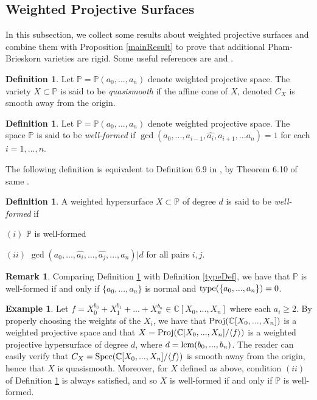 \documentclass[12pt]{amsart}
\theoremstyle{plain}
\theoremstyle{definition}
\newtheorem{definition}[subsection]{Definition}
\newtheorem{example}[subsection]{Example}
\newtheorem{remark}[subsection]{Remark}
\newcommand{\Spec}{		\operatorname{{\rm Spec}}}
\newcommand{\Proj}{		\operatorname{{\rm Proj}}}
\newcommand{\lcm}{		\operatorname{{\rm lcm}}}
\newcommand{\type}{		\operatorname{{\rm type}}}
\newcommand{\lb}{\langle}
\newcommand{\rb}{\rangle}
\newcommand{\Comp}{\ensuremath{\mathbb{C}}}
\newcommand{\proj}{\ensuremath{\mathbb{P}}}
\begin{document}
\subsection{Weighted Projective Surfaces} 
		

In this subsection, we collect some results about weighted projective surfaces and combine them with Proposition \ref{mainResult} to prove that additional Pham-Brieskorn varieties are rigid. Some useful references are \cite{iano-fletcher_2000} and \cite{dolgachev}.	

\begin{definition}
	Let $\proj = \proj(a_0, ..., a_n)$ denote weighted projective space. The variety $X \subset \proj$ is said to be \textit{quasismooth} if the affine cone of $X$, denoted $C_X$ is smooth away from the origin. 
\end{definition}

\begin{definition} \label{wellformed1} Let $\proj = \proj(a_0, ..., a_n)$ denote weighted projective space. The space $\proj$ is said to be \textit{well-formed} if $\gcd(a_0,...,a_{i-1}, \hat{a_i}, a_{i+1}, ... a_n) = 1$ for each $i = 1,...,n$. 
\end{definition}

The following definition is equivalent to Definition 6.9 in \cite{iano-fletcher_2000}, by Theorem 6.10 of same \cite{iano-fletcher_2000}.
\begin{definition}	\label{wellformed2}
A weighted hypersurface $X \subset \proj$ of degree $d$ is said to be \textit{well-formed} if 
	
	$(i)$ $\proj$ is well-formed 
	
	$(ii)$ $\gcd(a_0, ...,\hat{a_i},...,\hat{a_j},...,a_n) | d$ for all pairs $i,j$.  
\end{definition}

\begin{remark}
	Comparing Definition \ref{wellformed1} with Definition \ref{typeDef}, we have that $\proj$ is well-formed if and only if $\{a_0,..., a_n\}$ is normal and $\type(\{a_0,..., a_n\}) = 0$. 
\end{remark}

\begin{example}\label{weightedProjExample}
Let $f = X_0^{b_0} + X_1^{b_1} + ... + X_n^{b_n} \in \Comp[X_0, ..., X_n]$ where each $a_i \geq 2$. By properly choosing the weights of the $X_i$, we have that $\Proj(\Comp[X_0, ..., X_n])$ is a weighted projective space and that $X = \Proj(\Comp[X_0, ..., X_n] / \lb f \rb)$ is a weighted projective hypersurface of degree $d$, where $d = \lcm(b_0,...,b_n)$. The reader can easily verify that $C_X = \Spec(\Comp[X_0, ..., X_n] / \lb f \rb)$ is smooth away from the origin, hence that $X$ is quasismooth. Moreover, for $X$ defined as above, condition $(ii)$ of Definition \ref{wellformed2} is always satisfied, and so $X$ is well-formed if and only if $\proj$ is well-formed.
\end{example}
\end{document}
